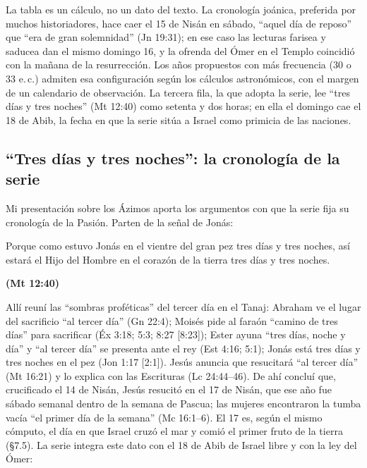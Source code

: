 \documentclass[11pt,letterpaper]{article}
\newcommand{\fuente}[1]{\par\hfill{\upshape\bfseries\small\textcolor{tierraroja}{#1}}}
\begin{document}
\begin{nota}
La tabla es un cálculo, no un dato del texto. La cronología joánica, preferida por muchos historiadores, hace caer el 15 de Nisán en sábado, ``aquel día de reposo'' que ``era de gran solemnidad'' (Jn 19:31); en ese caso las lecturas farisea y saducea dan el mismo domingo 16, y la ofrenda del Ómer en el Templo coincidió con la mañana de la resurrección. Los años propuestos con más frecuencia (30 o 33 e.\,c.) admiten esa configuración según los cálculos astronómicos, con el margen de un calendario de observación. La tercera fila, la que adopta la serie, lee ``tres días y tres noches'' (Mt 12:40) como setenta y dos horas; en ella el domingo cae el 18 de Abib, la fecha en que la serie sitúa a Israel como primicia de las naciones.
\end{nota}

\subsection{``Tres días y tres noches'': la cronología de la serie}
Mi presentación sobre los Ázimos aporta los argumentos con que la serie fija su cronología de la Pasión. Parten de la señal de Jonás:

\begin{cita}Porque como estuvo Jonás en el vientre del gran pez tres días y tres noches, así estará el Hijo del Hombre en el corazón de la tierra tres días y tres noches.\fuente{(Mt 12:40)}\end{cita}

Allí reuní las ``sombras proféticas'' del tercer día en el Tanaj: Abraham ve el lugar del sacrificio ``al tercer día'' (Gn 22:4); Moisés pide al faraón ``camino de tres días'' para sacrificar (Éx 3:18; 5:3; 8:27 [8:23]); Ester ayuna ``tres días, noche y día'' y ``al tercer día'' se presenta ante el rey (Est 4:16; 5:1); Jonás está tres días y tres noches en el pez (Jon 1:17 [2:1]). Jesús anuncia que resucitará ``al tercer día'' (Mt 16:21) y lo explica con las Escrituras (Lc 24:44--46). De ahí concluí que, crucificado el 14 de Nisán, Jesús resucitó en el 17 de Nisán, que ese año fue sábado semanal dentro de la semana de Pascua; las mujeres encontraron la tumba vacía ``el primer día de la semana'' (Mc 16:1--6). El 17 es, según el mismo cómputo, el día en que Israel cruzó el mar y comió el primer fruto de la tierra (§7.5). La serie integra este dato con el 18 de Abib de Israel libre y con la ley del Ómer:
\end{document}
